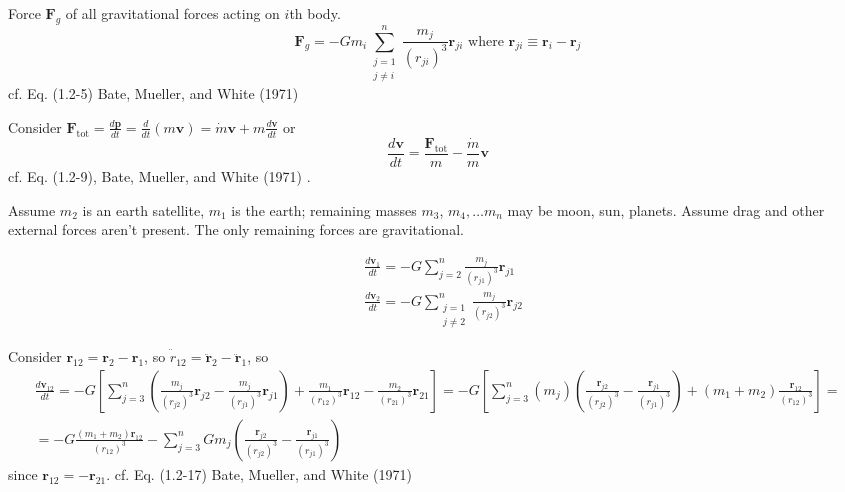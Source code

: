\documentclass[10pt]{amsart}
\begin{document}
\begin{multicols*}{2}
Force $\mathbf{F}_g$ of all gravitational forces acting on $i$th body.
\begin{equation}
	\mathbf{F}_g = -Gm_i \sum_{ \substack{ j=1 \\ j \neq i } }^n \frac{m_j}{ (r_{ji})^3 } \mathbf{r}_{ji} \text{ where } \mathbf{r}_{ji} \equiv \mathbf{r}_i - \mathbf{r}_j
\end{equation} cf. Eq. (1.2-5) Bate, Mueller, and White (1971) \cite{BMW1971}



Consider $\mathbf{F}_{\text{tot}} = \frac{d\mathbf{p}}{dt} = \frac{d}{dt} (m\mathbf{v}) = \dot{m} \mathbf{v} + m \frac{d\mathbf{v}}{dt} $ or 
\begin{equation}
	\frac{d\mathbf{v}}{dt} = \frac{ \mathbf{F}_{\text{tot}} }{ m} - \frac{\dot{m}}{m} \mathbf{v}
\end{equation}
cf. Eq. (1.2-9), Bate, Mueller, and White (1971) \cite{BMW1971}.

Assume $m_2$ is an earth satellite, $m_1$ is the earth; remaining masses $m_3$, $m_4, \dots m_n$ may be moon, sun, planets. Assume drag and other external forces aren't present. The only remaining forces are gravitational.

\[
\begin{aligned}
	& \frac{d\mathbf{v}_1}{dt} = -G \sum_{j=2}^n \frac{m_j}{(r_{j1})^3} \mathbf{r}_{j1} \\
	& \frac{d\mathbf{v}_2}{dt} = -G \sum_{ \substack{ j = 1 \\ j\neq 2} }^n \frac{m_j}{(r_{j2})^3} \mathbf{r}_{j2} 
\end{aligned}
\]

Consider $\mathbf{r}_{12} = \mathbf{r}_2 - \mathbf{r}_1$, so $\ddot{\widehat{r}}_{12} = \ddot{\mathbf{r}}_2 - \ddot{\mathbf{r}}_1$, so
\begin{equation}
	\begin{gathered}
		\frac{d\mathbf{v}_{12}}{dt} = -G \left[ \sum_{j=3}^n \left( \frac{m_j}{ (r_{j2})^3 } \mathbf{r}_{j2} - \frac{m_j}{ (r_{j1})^3 } \mathbf{r}_{j1} \right) + \frac{m_1}{ (r_{12})^3 } \mathbf{r}_{12} - \frac{m_2}{ (r_{21})^3 } \mathbf{r}_{21} \right] = -G \left[ \sum_{j=3}^n (m_j) \left( \frac{ \mathbf{r}_{j2} }{ (r_{j2})^3 } - \frac{ \mathbf{r}_{j1} }{ (r_{j1})^3 } \right) + (m_1 + m_2) \frac{ \mathbf{r}_{12} }{ (r_{12})^3 } \right] = \\
		= - G \frac{ (m_1+ m_2) \mathbf{r}_{12} }{ (r_{12})^3 } - \sum_{j=3}^n Gm_j \left( \frac{ \mathbf{r}_{j2} }{ (r_{j2})^3 } - \frac{ \mathbf{r}_{j1} }{ (r_{j1})^3 } \right)
	\end{gathered}
\end{equation}
since $\mathbf{r}_{12} = - \mathbf{r}_{21}$. cf. Eq. (1.2-17) Bate, Mueller, and White (1971) \cite{BMW1971}


\end{multicols*}
\end{document}

